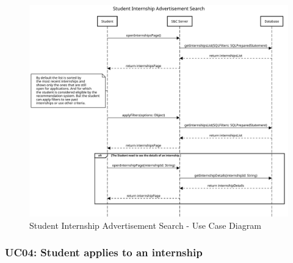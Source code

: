 \begin{figure}[H]
    \centering
    \includegraphics[width=1.0\textwidth]{Images/UC_3.pdf}
    \caption{Student Internship Advertisement Search - Use Case Diagram}
    \label{fig:use-case-diagram-3}
\end{figure}


\subsubsection{UC04: Student applies to an internship}
\label{subsubsec:student-applies-to-an-internship}

